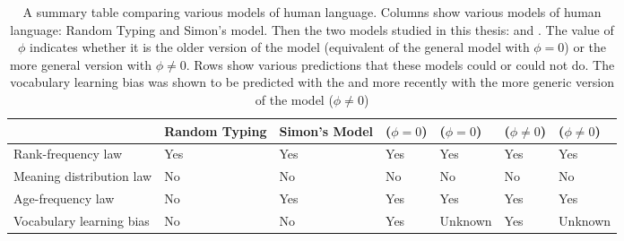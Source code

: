 \begin{table}
  \centering
  \begin{adjustbox}{max width=\textwidth}
    \begin{tabular}{p{2.5cm}p{1.5cm}p{1.5cm}p{1.5cm}p{1.5cm}p{1.5cm}p{1.5cm}}
      \toprule
                               & Random Typing & Simon's Model        & \Firstmodel{} ($\phi=0$) & \Secondmodel{} ($\phi=0$) & \Firstmodel{} ($\phi\neq 0$) & \Secondmodel{} ($\phi\neq 0$) \\
      \midrule
      Rank-frequency law       &      Yes      &      Yes             &             Yes          &           Yes             &           Yes                &           Yes                 \\
      \addlinespace
      Meaning distribution law &      No       &      No              &             No           &           No              &           No                 &           No                  \\
      \addlinespace
      Age-frequency law        &      No       &      Yes             &             Yes          &           Yes             &           Yes                &           Yes                 \\
      \addlinespace
      Vocabulary learning bias &      No       &      No              &  Yes \cite{Ferrer2017a}  &         Unknown           &  Yes \cite{Carrera2021a}     &         Unknown               \\
      \bottomrule
    \end{tabular}
  \end{adjustbox}
  \caption{
    A summary table comparing various models of human language.
    Columns show various models of human language: Random Typing and Simon's model.
    Then the two models studied in this thesis: \firstm{} and \secondmodel{}.
    The value of $\phi$ indicates whether it is the older version of the model (equivalent of the general model with $\phi=0$) or the more general version with $\phi \neq 0$.
    Rows show various predictions that these models could or could not do.
    The vocabulary learning bias was shown to be predicted with the \firstmodel{} and more recently with the more generic version of the model ($\phi \neq 0$)
  }
  \label{tab:comparison_models}
\end{table}


